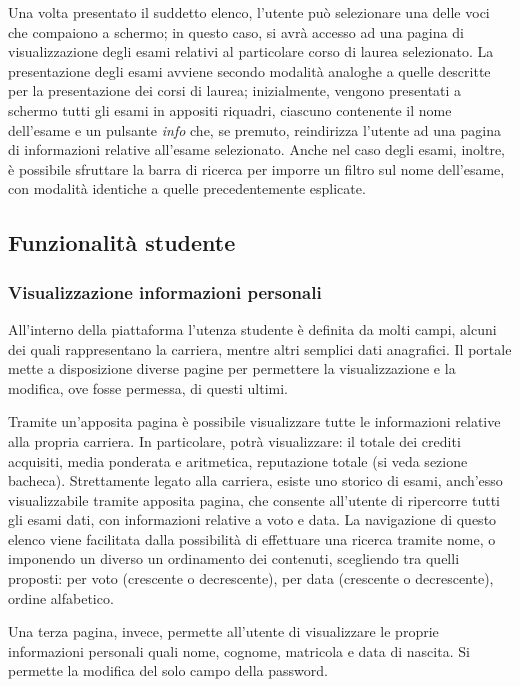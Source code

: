 \documentclass [a4paper,11pt]{book}
\begin{document}
Una volta presentato il suddetto elenco, l'utente può selezionare una delle voci che compaiono a schermo; in questo caso, si avrà accesso ad una pagina di visualizzazione degli esami relativi al particolare corso di laurea selezionato. La presentazione degli esami avviene secondo modalità analoghe a quelle descritte per la presentazione dei corsi di laurea; inizialmente, vengono presentati a schermo tutti gli esami in appositi riquadri, ciascuno contenente il nome dell'esame e un pulsante \emph{info} che, se premuto, reindirizza l'utente ad una pagina di informazioni relative all'esame selezionato. Anche nel caso degli esami, inoltre, è possibile sfruttare la barra di ricerca per imporre un filtro sul nome dell'esame, con modalità identiche a quelle precedentemente esplicate.

\medskip

\subsection{Funzionalità studente}

\subsubsection{Visualizzazione informazioni personali}

All'interno della piattaforma l'utenza studente è definita da molti campi, alcuni dei quali rappresentano la carriera, mentre altri semplici dati anagrafici. Il portale mette a disposizione diverse pagine per permettere la visualizzazione e la modifica, ove fosse permessa, di questi ultimi.

Tramite un'apposita pagina è possibile visualizzare tutte le informazioni relative alla propria carriera. In particolare, potrà visualizzare: il totale dei crediti acquisiti, media ponderata e aritmetica, reputazione totale (si veda sezione bacheca). Strettamente legato alla carriera, esiste uno storico di esami, anch'esso visualizzabile tramite apposita pagina, che consente all'utente di ripercorre tutti gli esami dati, con informazioni relative a voto e data. La navigazione di questo elenco viene facilitata dalla possibilità di effettuare una ricerca tramite nome, o imponendo un diverso un ordinamento dei contenuti, scegliendo tra quelli proposti: per voto (crescente o decrescente), per data (crescente o decrescente), ordine alfabetico.

Una terza pagina, invece, permette all'utente di visualizzare le proprie informazioni personali quali nome, cognome, matricola e data di nascita. Si permette la modifica del solo campo della password.
\end{document}
